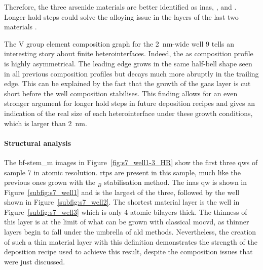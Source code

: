 Therefore, the three arsenide materials are better identified as \acs{inas}, , and . Longer hold steps could solve the alloying issue in the layers of the last two materials \cite{Brugnolotto2023_2}.

The V group element composition graph for the \qty{2}{\nano\metre}-wide well 9 tells an interesting story about finite heterointerfaces. Indeed, the \acl{as} composition profile is highly asymmetrical. The leading edge grows in the same half-bell shape seen in all previous composition profiles but decays much more abruptly in the trailing edge. This can be explained by the fact that the growth of the \acs{gaas} layer is cut short before the well composition stabilises. This finding allows for an even stronger argument for longer hold steps in future deposition recipes and gives an indication of the real size of each heterointerface under these growth conditions, which is larger than \qty{2}{\nano\metre}.
\par

\paragraph{Structural analysis} The \acs{bf}-\acs{stem_m} images in Figure~\ref{fig:s7_well1-3_HR} show the first three \acl{qw}s of sample 7 in atomic resolution. \Acl{rtp}s are present in this sample, much like the previous ones grown with the \(_B\) stabilisation method. The \acs{inas} \acs{qw} is shown in Figure~\ref{subfig:s7_well1} and is the largest of the three, followed by the  well shown in Figure~\ref{subfig:s7_well2}. The shortest material layer is the  well in Figure~\ref{subfig:s7_well3} which is only \num{4} atomic bilayers thick. The thinness of this layer is at the limit of what can be grown with classical \acs{mocvd}, as thinner layers begin to fall under the umbrella of \acf{ald} methods. Nevertheless, the creation of such a thin material layer with this definition demonstrates the strength of the deposition recipe used to achieve this result, despite the composition issues that were just discussed.
\par

